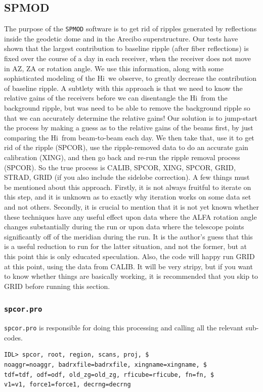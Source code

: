 \documentclass[11pt]{article}
\newcommand{\hi}{H{\sc i}~}
\begin{document}
\subsection{SPMOD}

The purpose of the \texttt{SPMOD} software is to get rid of ripples generated by reflections inside the geodetic dome and in the Arecibo superstructure. Our tests have shown that the largest contribution to baseline ripple (after fiber reflections) is fixed over the course of a day in each receiver, when the receiver does not move in AZ, ZA or rotation angle. We use this information, along with some sophisticated modeling of the \hi we observe, to greatly decrease the contribution of baseline ripple. A subtlety with this approach is that we need to know the relative gains of the receivers before we can disentangle the \hi from the background ripple, but was need to be able to remove the background ripple so that we can accurately determine the relative gains! Our solution is to jump-start the process by making a guess as to the relative gains of the beams first, by just comparing the \hi from beam-to-beam each day. We then take that, use it to get rid of the ripple (SPCOR), use the ripple-removed data to do an accurate gain calibration (XING), and then go back and re-run the ripple removal process (SPCOR). So the true process is CALIB, SPCOR, XING, SPCOR, GRID, STRAD, GRID (if you also include the sidelobe correction). A few things must be mentioned about this approach. Firstly, it is not always fruitful to iterate on this step, and it is unknown as to exactly why iteration works on some data set and not others. Secondly, it is crucial to mention that it is not yet known whether these techniques have any useful effect upon data where the ALFA rotation angle changes substantially during the run or upon data where the telescope points significantly off of the meridian during the run. It is the author's guess that this is a useful reduction to run for the latter situation, and not the former, but at this point this is only educated speculation. Also, the code will happy run GRID at this point, using the data from CALIB. It will be very stripy, but if you want to know whether things are basically working, it is recommended that you skip to GRID before running this section.

\subsubsection{\texttt{spcor.pro}}
 \texttt{spcor.pro} is responsible for doing this processing and calling all the relevant sub-codes. 
\begin{verbatim}
IDL> spcor, root, region, scans, proj, $
noaggr=noaggr, badrxfile=badrxfile, xingname=xingname, $
tdf=tdf, odf=odf, old_zg=old_zg, rficube=rficube, fn=fn, $
v1=v1, force1=force1, decrng=decrng 
\end{verbatim}
\end{document}
